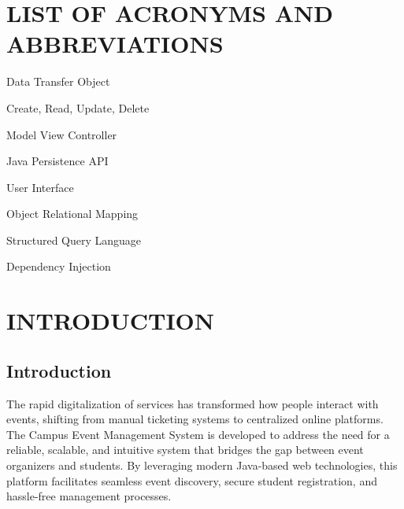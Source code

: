 \documentclass[12pt]{report}
\begin{document}
\listoftables 

 
\newpage 
{} 
  
\chapter*{LIST OF ACRONYMS AND ABBREVIATIONS} 
\begin{abbrv} 
  
\item[DTO] Data Transfer Object
\item[CRUD] Create, Read, Update, Delete
\item[MVC] Model View Controller
\item[JPA] Java Persistence API
\item[UI] User Interface
\item[ORM] Object Relational Mapping
\item[SQL] Structured Query Language
\item[DI] Dependency Injection

\end{abbrv} 

\newpage 
\renewcommand*\contentsname{TABLE OF CONTENTS} 
   
\tableofcontents 
 


\thispagestyle{empty} 
 
\chapter{INTRODUCTION} 
\section{Introduction}
The rapid digitalization of services has transformed how people interact with events, shifting from manual ticketing systems to centralized online platforms. The Campus Event Management System is developed to address the need for a reliable, scalable, and intuitive system that bridges the gap between event organizers and students. By leveraging modern Java-based web technologies, this platform facilitates seamless event discovery, secure student registration, and hassle-free management processes.
\linespread{1.5} 
\end{document}
